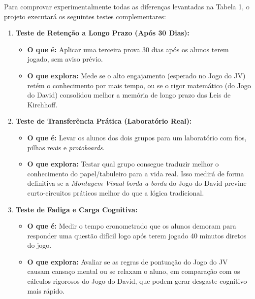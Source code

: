 \documentclass[12pt,a4paper,landscape]{article}
\begin{document}
Para comprovar experimentalmente todas as diferenças levantadas na Tabela 1, o projeto executará os seguintes testes complementares:

\begin{enumerate}
    \item \textbf{Teste de Retenção a Longo Prazo (Após 30 Dias):}
    \begin{itemize}
        \item \textbf{O que é:} Aplicar uma terceira prova 30 dias após os alunos terem jogado, sem aviso prévio.
        \item \textbf{O que explora:} Mede se o alto engajamento (esperado no Jogo do JV) retém o conhecimento por mais tempo, ou se o rigor matemático (do Jogo do David) consolidou melhor a memória de longo prazo das Leis de Kirchhoff.
    \end{itemize}

    \item \textbf{Teste de Transferência Prática (Laboratório Real):}
    \begin{itemize}
        \item \textbf{O que é:} Levar os alunos dos dois grupos para um laboratório com fios, pilhas reais e \textit{protoboards}.
        \item \textbf{O que explora:} Testar qual grupo consegue traduzir melhor o conhecimento do papel/tabuleiro para a vida real. Isso medirá de forma definitiva se a \textit{Montagem Visual borda a borda} do Jogo do David previne curto-circuitos práticos melhor do que a lógica tradicional.
    \end{itemize}

    \item \textbf{Teste de Fadiga e Carga Cognitiva:}
    \begin{itemize}
        \item \textbf{O que é:} Medir o tempo cronometrado que os alunos demoram para responder uma questão difícil logo após terem jogado 40 minutos diretos do jogo.
        \item \textbf{O que explora:} Avaliar se as regras de pontuação do Jogo do JV causam cansaço mental ou se relaxam o aluno, em comparação com os cálculos rigorosos do Jogo do David, que podem gerar desgaste cognitivo mais rápido.
    \end{itemize}
\end{enumerate}
\end{document}
